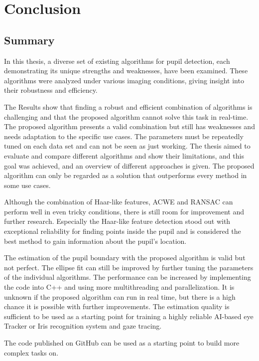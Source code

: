 \chapter{Conclusion}
\label{chap:conclusion}
\section{Summary}
\label{sec:summary}
In this thesis, a diverse set of existing algorithms for pupil detection, each demonstrating its unique strengths and weaknesses, have been examined. These algorithms were analyzed under various imaging conditions, giving insight into their robustness and efficiency.

The Results show that finding a robust and efficient combination of algorithms is challenging and that the proposed algorithm cannot solve this task in real-time. The proposed algorithm presents a valid combination but still has weaknesses and needs adaptation to the specific use cases. The parameters must be repeatedly tuned on each data set and can not be seen as just working. The thesis aimed to evaluate and compare different algorithms and show their limitations, and this goal was achieved, and an overview of different approaches is given. The proposed algorithm can only be regarded as a solution that outperforms every method in some use cases.

Although the combination of Haar-like features, ACWE and RANSAC can perform well in even tricky conditions, there is still room for improvement and further research. Especially the Haar-like feature detection stood out with exceptional reliability for finding points inside the pupil and is considered the best method to gain information about the pupil's location.

The estimation of the pupil boundary with the proposed algorithm is valid but not perfect. The ellipse fit can still be improved by further tuning the parameters of the individual algorithms. The performance can be increased by implementing the code into C++ and using more multithreading and parallelization. It is unknown if the proposed algorithm can run in real time, but there is a high chance it is possible with further improvements. The estimation quality is sufficient to be used as a starting point for training a highly reliable AI-based eye Tracker or Iris recognition system and gaze tracing.  

The code published on GitHub can be used as a starting point to build more complex tasks on.  